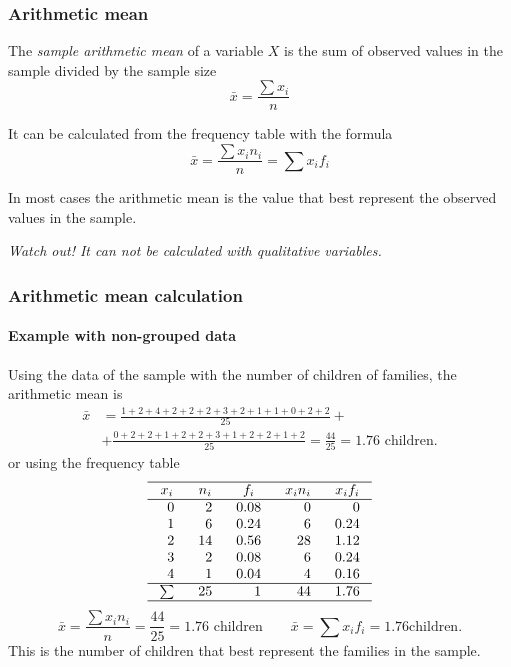 \begin{frame}
\frametitle{Arithmetic mean}
\begin{definition}
The \emph{sample arithmetic mean} of a variable $X$ is the sum of observed values in the sample divided by the sample
size
\[
\bar{x} = \frac{\sum x_i}{n}
\]
\end{definition}
It can be calculated from the frequency table with the formula
\[
\bar{x} = \frac{\sum x_in_i}{n} = \sum x_i f_i
\]

In most cases the arithmetic mean is the value that best represent the observed values in the sample. 
\begin{center}
\alert{\emph{Watch out! It can not be calculated with qualitative variables.}}
\end{center}
\end{frame}


\begin{frame}
\frametitle{Arithmetic mean calculation}
\framesubtitle{Example with non-grouped data}
Using the data of the sample with the number of children of families, the arithmetic mean is
\small
\begin{align*}
\bar{x} &= \frac{1+2+4+2+2+2+3+2+1+1+0+2+2}{25}+\\
&+\frac{0+2+2+1+2+2+3+1+2+2+1+2}{25} = \frac{44}{25} = 1.76 \mbox{ children}.
\end{align*}
\normalsize
or using the frequency table
\small
\[
\setlength\arraycolsep{3mm}
\setlength\arrayrulewidth{0.5pt}
\begin{array}{rrrrr}
\hline
\multicolumn{1}{c}{x_i} & \multicolumn{1}{c}{n_i} & \multicolumn{1}{c}{f_i} & \multicolumn{1}{c}{x_in_i} & \multicolumn{1}{c}{x_if_i}\\
\hline
0 & 2 & 0.08 & 0 & 0\\
1 & 6 & 0.24 & 6 & 0.24\\
2 & 14 & 0.56 & 28 & 1.12\\
3 & 2  & 0.08 & 6 & 0.24\\
4 & 1 & 0.04 & 4 & 0.16 \\
\hline
\sum & 25 & 1 & 44 & 1.76 \\
\hline
\end{array}
\]
\normalsize
\[
\bar{x} = \frac{\sum x_in_i}{n} = \frac{44}{25}= 1.76\mbox{ children} \qquad \bar{x}=\sum{x_if_i} = 1.76 \mbox{
children}.
\]
This is the number of children that best represent the families in the sample.
\end{frame}


